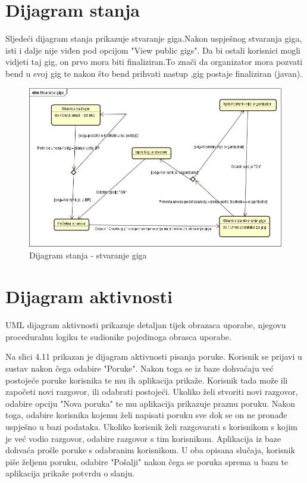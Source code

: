 		
	
	
	\eject
	
	\section{Dijagram stanja}
	
    Sljedeći dijagram stanja prikazuje stvaranje giga.Nakon uspješnog stvaranja giga, isti i dalje nije viđen pod opcijom "View public gigs". Da bi ostali korisnici mogli vidjeti taj gig, on prvo mora biti finaliziran.To znači da  organizator mora pozvati bend u svoj gig te nakon  što bend prihvati nastup ,gig postaje finaliziran (javan).
	
	
	
	
		\begin{figure}[H]
			\begin{center}
				\includegraphics[width=17cm]{slike/stmStvaranjeGiga.JPG}
			\end{center}
			\caption{Dijagram stanja - stvaranje giga}
			\label{fig:stm}
		\end{figure}
	
	\eject
	
	
	\section{Dijagram aktivnosti}
	
	UML dijagram aktivnosti prikazuje detaljan tijek obrazaca uporabe, njegovu proceduralnu logiku te sudionike pojedinoga obrasca uporabe. 
	
	Na slici 4.11 prikazan je dijagram aktivnosti pisanja poruke. Korisnik se prijavi u sustav nakon čega odabire "Poruke". Nakon toga se iz baze dohvaćaju već postojeće poruke korisnika te mu ih aplikacija prikaže. Korisnik tada može ili započeti novi razgovor, ili odabrati postojeći. Ukoliko želi stvoriti novi razgovor, odabire opciju "Nova poruka" te mu aplikacija prikazuje praznu poruku. Nakon toga, odabire korisnika kojemu želi napisati poruku sve dok se on ne pronađe uspješno u bazi podataka. Ukoliko korisnik želi razgovarati s korisnikom s kojim je već vodio razgovor, odabire razgovor s tim korisnikom. Aplikacija iz baze dohvaća prošle poruke s odabranim korisnikom. U oba opisana slučaja, korisnik piše željenu poruku, odabire "Pošalji" nakon čega se poruka sprema u bazu te aplikacija prikaže potvrdu o slanju. 
	
